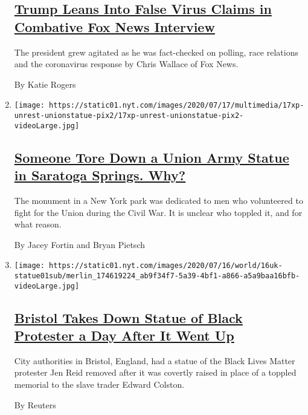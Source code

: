 \begin{enumerate}
  \hypertarget{trump-leans-into-false-virus-claims-in-combative-fox-news-interview}{%
  \subsection{\texorpdfstring{\href{/2020/07/19/us/politics/trump-fox-interview-coronavirus-race.html}{Trump
  Leans Into False Virus Claims in Combative Fox News
  Interview}}{Trump Leans Into False Virus Claims in Combative Fox News Interview}}\label{trump-leans-into-false-virus-claims-in-combative-fox-news-interview}}

  The president grew agitated as he was fact-checked on polling, race
  relations and the coronavirus response by Chris Wallace of Fox News.

  By Katie Rogers
\item
  \texttt{[image: https://static01.nyt.com/images/2020/07/17/multimedia/17xp-unrest-unionstatue-pix2/17xp-unrest-unionstatue-pix2-videoLarge.jpg]}

  \hypertarget{someone-tore-down-a-union-army-statue-in-saratoga-springs-why}{%
  \subsection{\texorpdfstring{\href{/2020/07/18/us/union-statue-saratoga-springs-ny.html}{Someone
  Tore Down a Union Army Statue in Saratoga Springs.
  Why?}}{Someone Tore Down a Union Army Statue in Saratoga Springs. Why?}}\label{someone-tore-down-a-union-army-statue-in-saratoga-springs-why}}

  The monument in a New York park was dedicated to men who volunteered
  to fight for the Union during the Civil War. It is unclear who toppled
  it, and for what reason.

  By Jacey Fortin and Bryan Pietsch
\item
  \texttt{[image: https://static01.nyt.com/images/2020/07/16/world/16uk-statue01sub/merlin\_174619224\_ab9f34f7-5a39-4bf1-a866-a5a9baa16bfb-videoLarge.jpg]}

  \hypertarget{bristol-takes-down-statue-of-black-protester-a-day-after-it-went-up}{%
  \subsection{\texorpdfstring{\href{/video/us/politics/100000007242014/bristol-jen-reid-statute-removed.html}{Bristol
  Takes Down Statue of Black Protester a Day After It Went
  Up}}{Bristol Takes Down Statue of Black Protester a Day After It Went Up}}\label{bristol-takes-down-statue-of-black-protester-a-day-after-it-went-up}}

  City authorities in Bristol, England, had a statue of the Black Lives
  Matter protester Jen Reid removed after it was covertly raised in
  place of a toppled memorial to the slave trader Edward Colston.

  By Reuters
\end{enumerate}

